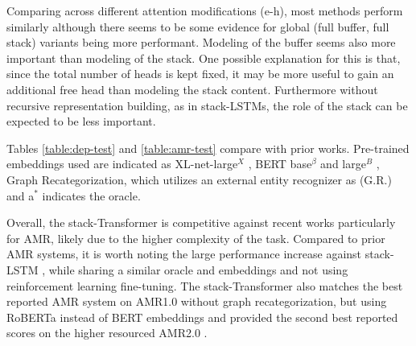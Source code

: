 \documentclass[11pt,a4paper]{article}
\begin{document}
Comparing across different attention modifications (e-h), most methods perform similarly although there seems to be some evidence for global (full buffer, full stack) variants being more performant. Modeling of the buffer seems also more important than modeling of the stack. One possible explanation for this is that, since the total number of heads is kept fixed, it may be more useful to gain an additional free head than modeling the stack content. Furthermore without recursive representation building, as in stack-LSTMs, the role of the stack can be expected to be less important. 

Tables \ref{table:dep-test} and \ref{table:amr-test} compare with prior works. Pre-trained embeddings used are indicated as XL-net-large$^X$ \cite{yang2019xlnet}, BERT base$^\beta$ and large$^B$ \cite{devlin-etal-2019-bert}, Graph Recategorization, which utilizes an external entity recognizer \cite{lyu2018amr,zhang2019broad} as (G.R.) and a$^*$ indicates the  oracle.

Overall, the stack-Transformer is competitive against recent works particularly for AMR, likely due to the higher complexity of the task. Compared to prior AMR systems, it is worth noting the large performance increase against stack-LSTM \cite{naseem2019rewarding}, while sharing a similar oracle and embeddings and not using reinforcement learning fine-tuning. The stack-Transformer also matches the best reported AMR system \cite{cai2020amr} on AMR1.0 without graph recategorization, but using RoBERTa instead of BERT embeddings and provided the second best reported scores on the higher resourced AMR2.0 \footnotemark{}. 
\end{document}
